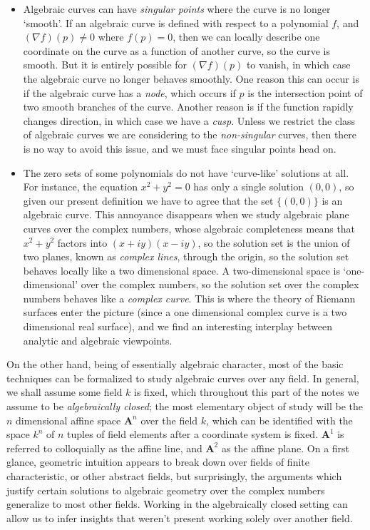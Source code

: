 \begin{itemize}
    \item Algebraic curves can have \emph{singular points} where the curve is no longer `smooth'. If an algebraic curve is defined with respect to a polynomial $f$, and $(\nabla f)(p) \neq 0$ where $f(p) = 0$, then we can locally describe one coordinate on the curve as a function of another curve, so the curve is smooth. But it is entirely possible for $(\nabla f)(p)$ to vanish, in which case the algebraic curve no longer behaves smoothly. One reason this can occur is if the algebraic curve has a \emph{node}, which occurs if $p$ is the intersection point of two smooth branches of the curve. Another reason is if the function rapidly changes direction, in which case we have a \emph{cusp}. Unless we restrict the class of algebraic curves we are considering to the \emph{non-singular} curves, then there is no way to avoid this issue, and we must face singular points head on.

    \item The zero sets of some polynomials do not have `curve-like' solutions at all. For instance, the equation $x^2 + y^2 = 0$ has only a single solution $(0,0)$, so given our present definition we have to agree that the set $\{ (0,0) \}$ is an algebraic curve. This annoyance disappears when we study algebraic plane curves over the complex numbers, whose algebraic completeness means that $x^2 + y^2$ factors into $(x + iy)(x - iy)$, so the solution set is the union of two planes, known as \emph{complex lines}, through the origin, so the solution set behaves locally like a two dimensional space. A two-dimensional space is `one-dimensional' over the complex numbers, so the solution set over the complex numbers behaves like a \emph{complex curve}. This is where the theory of Riemann surfaces enter the picture (since a one dimensional complex curve is a two dimensional real surface), and we find an interesting interplay between analytic and algebraic viewpoints.
\end{itemize}
%
On the other hand, being of essentially algebraic character, most of the basic techniques can be formalized to study algebraic curves over any field. In general, we shall assume some field $k$ is fixed, which throughout this part of the notes we assume to be \emph{algebraically closed}; the most elementary object of study will be the $n$ dimensional affine space $\mathbf{A}^n$ over the field $k$, which can be identified with the space $k^n$ of $n$ tuples of field elements after a coordinate system is fixed. $\mathbf{A}^1$ is referred to colloquially as the affine line, and $\mathbf{A}^2$ as the affine plane. On a first glance, geometric intuition appears to break down over fields of finite characteristic, or other abstract fields, but surprisingly, the arguments which justify certain solutions to algebraic geometry over the complex numbers generalize to most other fields. Working in the algebraically closed setting can allow us to infer insights that weren't present working solely over another field.

